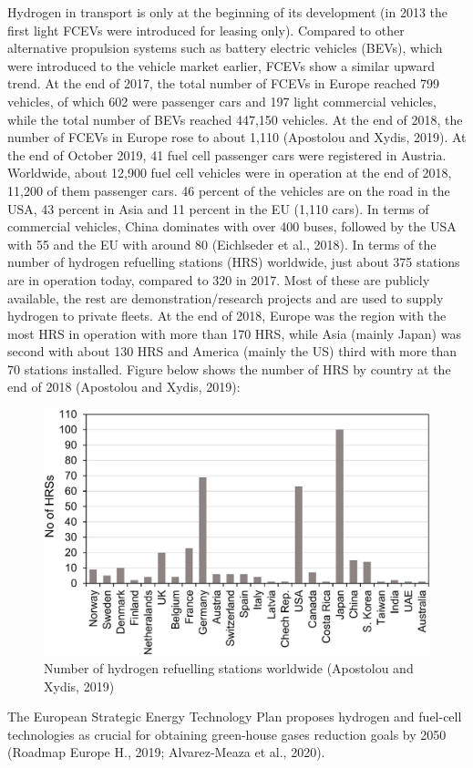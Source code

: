 \documentclass[
]{book}
\begin{document}
Hydrogen in transport is only at the beginning of its development (in 2013 the first light FCEVs were introduced for leasing only). Compared to other alternative propulsion systems such as battery electric vehicles (BEVs), which were introduced to the vehicle market earlier, FCEVs show a similar upward trend. At the end of 2017, the total number of FCEVs in Europe reached 799 vehicles, of which 602 were passenger cars and 197 light commercial vehicles, while the total number of BEVs reached 447,150 vehicles. At the end of 2018, the number of FCEVs in Europe rose to about 1,110 (Apostolou and Xydis, 2019).
At the end of October 2019, 41 fuel cell passenger cars were registered in Austria. Worldwide, about 12,900 fuel cell vehicles were in operation at the end of 2018, 11,200 of them passenger cars. 46 percent of the vehicles are on the road in the USA, 43 percent in Asia and 11 percent in the EU (1,110 cars). In terms of commercial vehicles, China dominates with over 400 buses, followed by the USA with 55 and the EU with around 80 (Eichlseder et al., 2018).
In terms of the number of hydrogen refuelling stations (HRS) worldwide, just about 375 stations are in operation today, compared to 320 in 2017. Most of these are publicly available, the rest are demonstration/research projects and are used to supply hydrogen to private fleets. At the end of 2018, Europe was the region with the most HRS in operation with more than 170 HRS, while Asia (mainly Japan) was second with about 130 HRS and America (mainly the US) third with more than 70 stations installed. Figure below shows the number of HRS by country at the end of 2018 (Apostolou and Xydis, 2019):

\begin{figure}
\includegraphics[width=0.6\linewidth]{image/hydrogen_refuel} \caption{Number of hydrogen refuelling stations worldwide (Apostolou and Xydis, 2019)}\label{fig:unnamed-chunk-8}
\end{figure}

The European Strategic Energy Technology Plan proposes hydrogen and fuel-cell technologies as crucial for obtaining green-house gases reduction goals by 2050 (Roadmap Europe H., 2019; Alvarez-Meaza et al., 2020).
\end{document}
